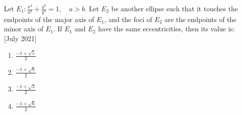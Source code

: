     \item Let $E_1 : \frac{x^2}{a^2} + \frac{y^2}{b^2} = 1, \quad a > b$. Let $ E_2 $ be another ellipse such that it touches the endpoints of the major axis of $ E_1 $, and the foci of $ E_2 $ are the endpoints of the minor axis of $ E_1 $. If $ E_1 $ and $ E_2 $ have the same eccentricities, then its value is:
    \hfill{[July 2021]}
    \begin{enumerate}
        \item $ \frac{-1 + \sqrt{5}}{2} $
        \item $ \frac{-1 + \sqrt{8}}{2} $
        \item $ \frac{-1 + \sqrt{3}}{2} $
        \item $ \frac{-1 + \sqrt{6}}{2} $
    \end{enumerate}

   




